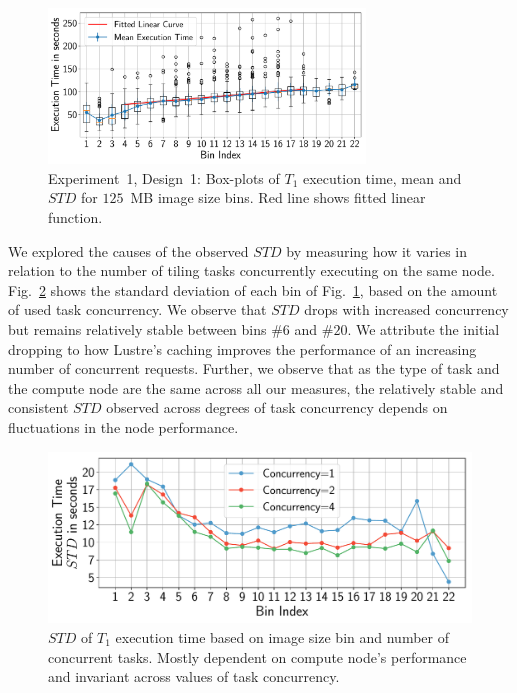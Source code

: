 \begin{figure}[H]
    \centering
    \includegraphics[width=0.75\textwidth]{figures/designs/stage_0_tx_box.pdf}
    \caption{Experiment~1, Design~1: Box-plots of $T_{1}$ execution time, mean and $STD$ for $125$~MB image size bins.
        Red line shows fitted linear function.}\label{fig:stage_0_execution}
\end{figure}

We explored the causes of the observed $STD$ by measuring how it varies in relation to the number of tiling tasks concurrently executing on the same node.
Fig.~\ref{fig:concurrency_test} shows the standard deviation of each bin of Fig.~\ref{fig:stage_0_execution}, based on the amount of used task concurrency.
We observe that $STD$ drops with increased concurrency but remains relatively stable between bins $\#6$ and $\#20$.
We attribute the initial dropping to how Lustre's caching improves the performance of an increasing number of concurrent requests.
Further, we observe that as the type of task and the compute node are the same across all our measures, the relatively stable and consistent $STD$ observed across degrees of task concurrency depends on fluctuations in the node performance.

\begin{figure}[H]
    \centering
    \includegraphics[width=.75\textwidth]{figures/designs/concerrency_std.pdf}
    \caption{$STD$ of $T_{1}$ execution time based on image size bin and number of concurrent tasks.
        Mostly dependent on compute node's performance and invariant across values of task concurrency.}\label{fig:concurrency_test}
\end{figure}

